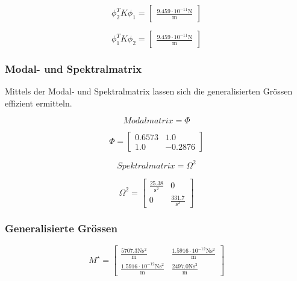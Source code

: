 \documentclass[
  letterpaper,
  DIV=11]{scrreprt}
\begin{document}
\begin{equation}\phi_{2}^{T} K \phi_{1} = \left[\begin{matrix}\frac{9.459 \cdot 10^{-11} \text{N}}{\text{m}}\end{matrix}\right]\end{equation}

\begin{equation}\phi_{1}^{T} K \phi_{2} = \left[\begin{matrix}\frac{9.459 \cdot 10^{-11} \text{N}}{\text{m}}\end{matrix}\right]\end{equation}

\hypertarget{modal--und-spektralmatrix-2}{%
\subsubsection{Modal- und
Spektralmatrix}\label{modal--und-spektralmatrix-2}}

Mittels der Modal- und Spektralmatrix lassen sich die generalisierten
Grössen effizient ermitteln.

\begin{equation}Modalmatrix = \Phi\end{equation}

\begin{equation}\Phi = \left[\begin{matrix}0.6573 & 1.0\\1.0 & -0.2876\end{matrix}\right]\end{equation}

\begin{equation}Spektralmatrix = \Omega^{2}\end{equation}

\begin{equation}\Omega^{2} = \left[\begin{matrix}\frac{25.38}{\text{s}^{2}} & 0\\0 & \frac{331.7}{\text{s}^{2}}\end{matrix}\right]\end{equation}

\hypertarget{generalisierte-gruxf6ssen-2}{%
\subsubsection{Generalisierte
Grössen}\label{generalisierte-gruxf6ssen-2}}

\begin{equation}M^{\star} = \left[\begin{matrix}\frac{5707.3 \text{N} \text{s}^{2}}{\text{m}} & \frac{1.5916 \cdot 10^{-12} \text{N} \text{s}^{2}}{\text{m}}\\\frac{1.5916 \cdot 10^{-12} \text{N} \text{s}^{2}}{\text{m}} & \frac{2497.0 \text{N} \text{s}^{2}}{\text{m}}\end{matrix}\right]\end{equation}
\end{document}
